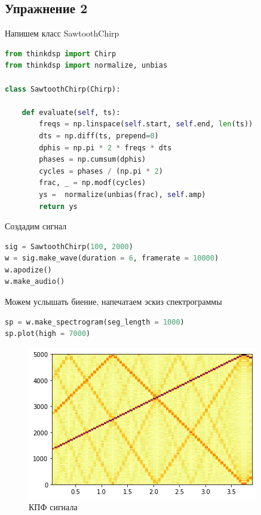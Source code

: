 \subsection{Упражнение 2}


Напишем класс SawtoothChirp

\begin{lstlisting}[language=Python]
from thinkdsp import Chirp
from thinkdsp import normalize, unbias

class SawtoothChirp(Chirp):

    def evaluate(self, ts):
        freqs = np.linspace(self.start, self.end, len(ts))
        dts = np.diff(ts, prepend=0)
        dphis = np.pi * 2 * freqs * dts
        phases = np.cumsum(dphis)
        cycles = phases / (np.pi * 2)
        frac, _ = np.modf(cycles)
        ys =  normalize(unbias(frac), self.amp)
        return ys
\end{lstlisting}

Создадим сигнал

\begin{lstlisting}[language=Python]
sig = SawtoothChirp(100, 2000)
w = sig.make_wave(duration = 6, framerate = 10000)
w.apodize()
w.make_audio()
\end{lstlisting}

Можем услышать биение, напечатаем эскиз спектрограммы

\begin{lstlisting}[language=Python]
sp = w.make_spectrogram(seg_length = 1000)
sp.plot(high = 7000)
\end{lstlisting}

\begin{figure}[H]
	\begin{center}
		\includegraphics[scale=1]{fig/lab03/lab03_10.png}
		\caption{КПФ сигнала}
	\end{center}
\end{figure}


